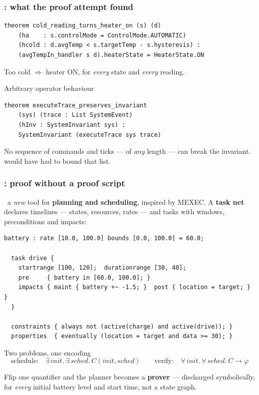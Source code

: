 \begin{frame}[fragile]
  \frametitle{\fcheck{}: what the proof attempt found} \small

\begin{lstlisting}[language=lean4]
theorem cold_reading_turns_heater_on (s) (d)
    (ha    : s.controlMode = ControlMode.AUTOMATIC)
    (hcold : d.avgTemp < s.targetTemp - s.hysteresis) :
    (avgTempIn_handler s d).heaterState = HeaterState.ON
\end{lstlisting}

Too cold $\Rightarrow$ heater ON, for {\em every} state and {\em every} reading.

\pause
\vspace{0.4cm}

\begin{block}{Arbitrary operator behaviour}\small
\begin{lstlisting}[language=lean4]
theorem executeTrace_preserves_invariant
    (sys) (trace : List SystemEvent)
    (hInv : SystemInvariant sys) :
    SystemInvariant (executeTrace sys trace)
\end{lstlisting}
{\scriptsize No sequence of commands and ticks --- of {\em any} length --- can break the
invariant. \spin{} would have had to bound that list.}
\end{block}

\end{frame}

\begin{frame}[fragile]
  \frametitle{\tasksat{}: proof without a proof script} \small

\newtag{} \ a {\em new} tool for {\bf planning and scheduling}, inspired by MEXEC.
A {\bf task net} declares timelines --- states, resources, rates --- and tasks with
windows, preconditions and impacts:

\begin{lstlisting}[language=tasknetdsl,frame=single]
  battery : rate [10.0, 100.0] bounds [0.0, 100.0] = 60.0;

  task drive {
    startrange [100, 120];  durationrange [30, 40];
    pre     { battery in [60.0, 100.0]; }
    impacts { maint { battery +~ -1.5; }  post { location = target; } }
  }

  constraints { always not (active(charge) and active(drive)); }
  properties  { eventually (location = target and data >= 30); }
\end{lstlisting}

\pause

\begin{block}{Two problems, one encoding}\small
\[
\text{schedule:}\quad \exists\, \mathit{init}.\ \exists\, \mathit{sched}.\ C(\mathit{init},\mathit{sched})
\qquad
\text{verify:}\quad \forall\, \mathit{init}.\ \forall\, \mathit{sched}.\ C \rightarrow \varphi
\]
\end{block}

Flip one quantifier and the planner becomes a {\bf prover} --- discharged
symbolically, for {\em every} initial battery level and start time, not a state graph.

\end{frame}

